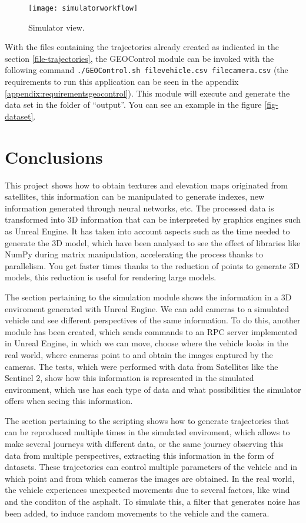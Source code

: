 \documentclass[10pt,a4paper,twocolumn,twoside]{article}
\begin{document}
\begin{figure}[h]
\centering
  	\texttt{[image: simulatorworkflow]}
	\caption{Simulator view.}
	\label{fig-workflowsimulator}
\end{figure}

With the files containing the trajectories already created as indicated in the section \ref{file-trajectories}, the GEOControl module can be invoked with the following command \texttt{./GEOControl.sh filevehicle.csv filecamera.csv} (the requirements to run this application can be seen in the appendix \ref{appendix:requirementsgeocontrol}). This module will execute and generate the data set in the folder of ``output''. You can see an example in the figure \ref{fig-dataset}.

\section{Conclusions}

This project shows how to obtain textures and elevation maps originated from satellites, this information can be manipulated to generate indexes, new information generated through neural networks, etc. The processed data is transformed into 3D information that can be interpreted by graphics engines such as Unreal Engine. It has taken into account aspects such as the time needed to generate the 3D model, which have been analysed to see the effect of libraries like NumPy during matrix manipulation, accelerating the process thanks to parallelism. You get faster times thanks to the reduction of points to generate 3D models, this reduction is useful for rendering large models.

The section pertaining to the simulation module shows the information in a 3D enviroment generated with Unreal Engine. We can add cameras to a simulated vehicle and see different perspectives of the same information. To do this, another module has been created, which sends commands to an RPC server implemented in Unreal Engine, in which we can move, choose where the vehicle looks in the real world, where cameras point to and obtain the images captured by the cameras.
The tests, which were performed with data from Satellites like the Sentinel 2, show how this information is represented in the simulated environment, which use has each type of data and what possibilities the simulator offers when seeing this information.

The section pertaining to the scripting shows how to generate trajectories that can be reproduced multiple times in the simulated enviroment, which allows to make several journeys with different data, or the same journey observing this data from multiple perspectives, extracting this information in the form of datasets. These trajectories can control multiple parameters of the vehicle and in which point and from which cameras the images are obtained. In the real world, the vehicle experiences unexpected movements due to several factors, like wind and the conditon of the asphalt. To simulate this, a filter that generates noise has been added, to induce random movements to the vehicle and the camera.
\end{document}
